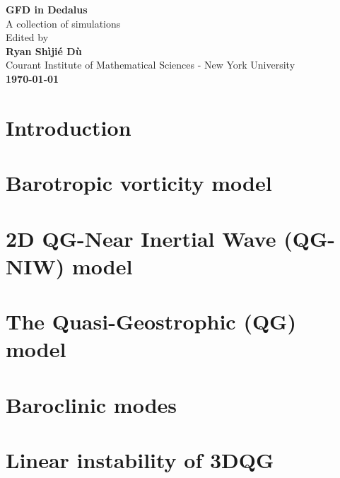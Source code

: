 \documentclass[11pt,letterpaper]{book}
\begin{document}
\begin{titlepage}
    \begin{center}
        \vspace*{4cm}
        \Huge
        \textbf{GFD in Dedalus} \\
        \vspace{0.5cm}
        \LARGE
        {A collection of simulations}\\
        \vspace{3cm}
        Edited by\\
        \vspace{0.5cm}
        \textbf{Ryan Sh\`iji\'e D\`u}\\
        \vspace{0.2cm}
        \normalsize
        {Courant Institute of Mathematical Sciences - New York University}\\
        \vspace{2cm}
        \Large
        \textbf{\today}
        
    \end{center}
\end{titlepage}

\setcounter{tocdepth}{4}
\tableofcontents
\chapter{Introduction}


\chapter{Barotropic vorticity model}\label{chap:Baro_vort}


% 

\chapter{2D QG-Near Inertial Wave (QG-NIW) model}


\chapter{The Quasi-Geostrophic (QG) model}


\chapter{Baroclinic modes}


\chapter{Linear instability of 3DQG}





\newpage
\printbibliography
\end{document}
